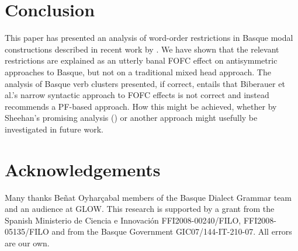 \documentclass[output=paper]{langscibook}
\begin{document}
\section{Conclusion}
This paper has presented an analysis of word-order restrictions in Basque modal constructions described in recent work by \cite{etxepare-uribeetxebarria2009, etxepare-uribeetxebarria2012}.  We have shown that the relevant restrictions are explained as an utterly banal FOFC effect on antisymmetric approaches to Basque, but not on a traditional mixed head approach.  The analysis of Basque verb clusters presented, if correct, entails that Biberauer et al.'s narrow syntactic approach to FOFC effects is not correct and instead recommends a PF-based approach. How this might be achieved, whether by Sheehan's promising analysis (\citeyear{sheehan2013, sheehan2012}) or another approach might usefully be investigated in future work.
	
\section*{Acknowledgements}
Many  thanks Be\~nat Oyhar\c cabal members of the Basque Dialect Grammar team and an audience at GLOW. This research is supported by a grant from the Spanish Ministerio de Ciencia e Innovaci\'on FFI2008-00240/FILO, FFI2008-05135/FILO and from the Basque Government GIC07/144-IT-210-07. All errors are our own.
	
\printbibliography[heading=subbibliography,notkeyword=this]

%
%
%
\end{document}
